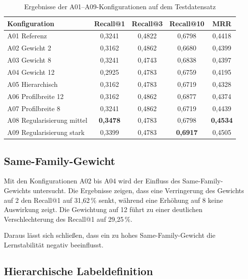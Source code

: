 \begin{table}[H] 
    \centering 
    \caption{Ergebnisse der A01--A09-Konfigurationen auf dem Testdatensatz} 
    \label{tab:konfigurationsvergleich} 
    \small 
    \begin{tabular}{lcccc} 
        \toprule 
        \textbf{Konfiguration} & \textbf{Recall@1} & \textbf{Recall@3} & \textbf{Recall@10} & \textbf{MRR} \\ 
        \midrule 
        A01 Referenz & 0,3241 & 0,4822 & 0,6798 & 0,4418 \\ 
        A02 Gewicht 2 & 0,3162 & 0,4862 & 0,6680 & 0,4399 \\ 
        A03 Gewicht 8 & 0,3241 & 0,4743 & 0,6838 & 0,4397 \\ 
        A04 Gewicht 12 & 0,2925 & 0,4783 & 0,6759 & 0,4195 \\ 
        A05 Hierarchisch & 0,3162 & 0,4783 & 0,6719 & 0,4328 \\ 
        A06 Profilbreite 12 & 0,3162 & 0,4862 & 0,6877 & 0,4374 \\ 
        A07 Profilbreite 8 & 0,3241 & 0,4862 & 0,6719 & 0,4439 \\ 
        A08 Regularisierung mittel & \textbf{0,3478} & 0,4783 & 0,6798 & \textbf{0,4534} \\ 
        A09 Regularisierung stark & 0,3399 & 0,4783 & \textbf{0,6917} & 0,4505 \\ 
        \bottomrule 
    \end{tabular} 
\end{table}


\subsection{Same-Family-Gewicht}

Mit den Konfigurationen A02 bis A04 wird der Einfluss des Same-Family-Gewichts untersucht. 
Die Ergebnisse zeigen, dass eine Verringerung des Gewichts auf 2 den Recall@1 auf 31,62\,\% senkt, während eine Erhöhung auf 8 keine Auswirkung zeigt.
Die Gewichtung auf 12 führt zu einer deutlichen Verschlechterung des Recall@1 auf 29,25\,\%.

Daraus lässt sich schließen, dass ein zu hohes Same-Family-Gewicht die Lernstabilität negativ beeinflusst.

\subsection{Hierarchische Labeldefinition}

